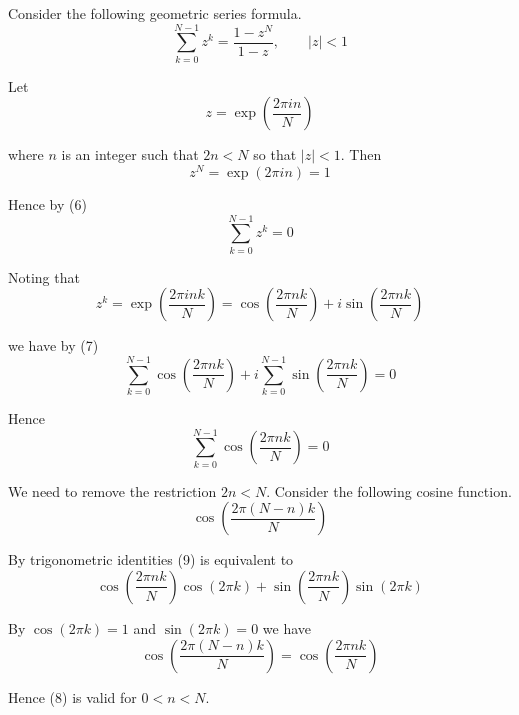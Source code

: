 \documentclass[12pt]{article}
\begin{document}
Consider the following geometric series formula.
\begin{equation*}
\sum_{k=0}^{N-1}z^k=\frac{1-z^N}{1-z},\qquad|z|<1
\tag{6}
\end{equation*}

Let
\begin{equation*}
z=\exp\left(\frac{2\pi in}{N}\right)
\end{equation*}

where $n$ is an integer such that $2n<N$ so that $|z|<1$.
Then
\begin{equation*}
z^N=\exp(2\pi in)=1
\end{equation*}

Hence by (6)
\begin{equation*}
\sum_{k=0}^{N-1}z^k=0
\tag{7}
\end{equation*}

Noting that
\begin{equation*}
z^k=\exp\left(\frac{2\pi ink}{N}\right)=\cos\left(\frac{2\pi nk}{N}\right)+i\sin\left(\frac{2\pi nk}{N}\right)
\end{equation*}

we have by (7)
\begin{equation*}
\sum_{k=0}^{N-1}\cos\left(\frac{2\pi nk}{N}\right)+i\sum_{k=0}^{N-1}\sin\left(\frac{2\pi nk}{N}\right)=0
\end{equation*}

Hence
\begin{equation*}
\sum_{k=0}^{N-1}\cos\left(\frac{2\pi nk}{N}\right)=0
\tag{8}
\end{equation*}

We need to remove the restriction $2n<N$.
Consider the following cosine function.
\begin{equation*}
\cos\left(\frac{2\pi(N-n)k}{N}\right)
\tag{9}
\end{equation*}

By trigonometric identities (9) is equivalent to
\begin{equation*}
\cos\left(\frac{2\pi nk}{N}\right)\cos(2\pi k)
+\sin\left(\frac{2\pi nk}{N}\right)\sin(2\pi k)
\end{equation*}

By $\cos(2\pi k)=1$ and $\sin(2\pi k)=0$ we have
\begin{equation*}
\cos\left(\frac{2\pi(N-n)k}{N}\right)=\cos\left(\frac{2\pi nk}{N}\right)
\tag{10}
\end{equation*}

Hence (8) is valid for $0<n<N$.
\end{document}
